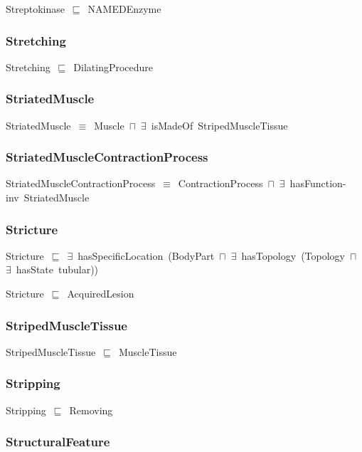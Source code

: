 \documentclass{article}
\begin{document}
Streptokinase~\ensuremath{\sqsubseteq}~NAMEDEnzyme~

\subsubsection*{Stretching}

Stretching~\ensuremath{\sqsubseteq}~DilatingProcedure~

\subsubsection*{StriatedMuscle}

StriatedMuscle~\ensuremath{\equiv}~Muscle~\ensuremath{\sqcap}~\ensuremath{\exists}~isMadeOf~StripedMuscleTissue

\subsubsection*{StriatedMuscleContractionProcess}

StriatedMuscleContractionProcess~\ensuremath{\equiv}~ContractionProcess~\ensuremath{\sqcap}~\ensuremath{\exists}~hasFunction-inv~StriatedMuscle

\subsubsection*{Stricture}

Stricture~\ensuremath{\sqsubseteq}~\ensuremath{\exists}~hasSpecificLocation~(BodyPart~\ensuremath{\sqcap}~\ensuremath{\exists}~hasTopology~(Topology~\ensuremath{\sqcap}~\ensuremath{\exists}~hasState~tubular))~

Stricture~\ensuremath{\sqsubseteq}~AcquiredLesion~

\subsubsection*{StripedMuscleTissue}

StripedMuscleTissue~\ensuremath{\sqsubseteq}~MuscleTissue~

\subsubsection*{Stripping}

Stripping~\ensuremath{\sqsubseteq}~Removing~

\subsubsection*{StructuralFeature}
\end{document}
